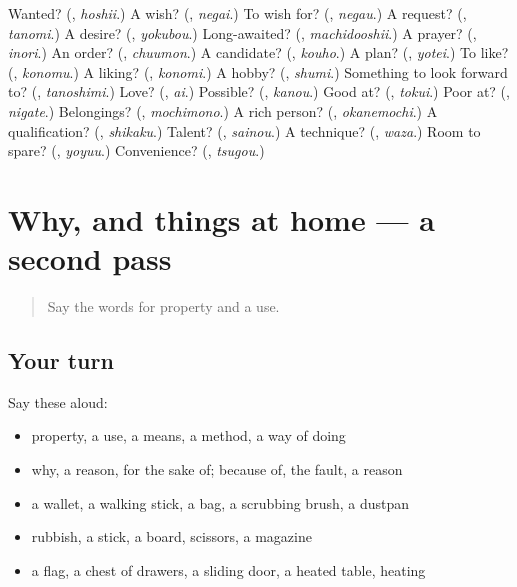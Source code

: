 \begin{tcolorbox}[breakable,colback=teal!4,colframe=teal!35!black,title={Before you move on}]
Wanted? (\textbf{}, \emph{hoshii}.) A wish? (\textbf{}, \emph{negai}.) To wish for? (\textbf{}, \emph{negau}.) A request? (\textbf{}, \emph{tanomi}.) A desire? (\textbf{}, \emph{yokubou}.) Long-awaited? (\textbf{}, \emph{machidooshii}.) A prayer? (\textbf{}, \emph{inori}.) An order? (\textbf{}, \emph{chuumon}.) A candidate? (\textbf{}, \emph{kouho}.) A plan? (\textbf{}, \emph{yotei}.) To like? (\textbf{}, \emph{konomu}.) A liking? (\textbf{}, \emph{konomi}.) A hobby? (\textbf{}, \emph{shumi}.) Something to look forward to? (\textbf{}, \emph{tanoshimi}.) Love? (\textbf{}, \emph{ai}.) Possible? (\textbf{}, \emph{kanou}.) Good at? (\textbf{}, \emph{tokui}.) Poor at? (\textbf{}, \emph{nigate}.) Belongings? (\textbf{}, \emph{mochimono}.) A rich person? (\textbf{}, \emph{okanemochi}.) A qualification? (\textbf{}, \emph{shikaku}.) Talent? (\textbf{}, \emph{sainou}.) A technique? (\textbf{}, \emph{waza}.) Room to spare? (\textbf{}, \emph{yoyuu}.) Convenience? (\textbf{}, \emph{tsugou}.)
\end{tcolorbox}
\section[(dialogue)]{Why, and things at home — a second pass}

\label{lesson:JA-R101-second-pass-why-and-things-at-home}



\begin{quote}
Say the words for property and a use.
\end{quote}

\subsection*{Your turn}
Say these aloud:

\begin{itemize}
\raggedright
  \item property, a use, a means, a method, a way of doing
  \item why, a reason, for the sake of; because of, the fault, a reason
  \item a wallet, a walking stick, a bag, a scrubbing brush, a dustpan
  \item rubbish, a stick, a board, scissors, a magazine
  \item a flag, a chest of drawers, a sliding door, a heated table, heating
\end{itemize}

